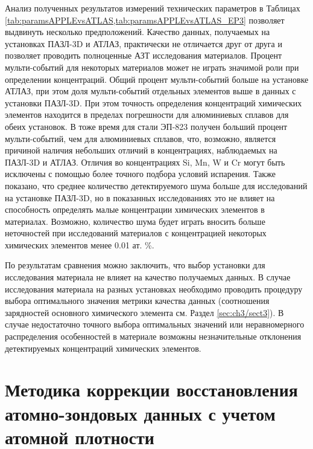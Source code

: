 Анализ полученных результатов измерений технических параметров в Таблицах \cref{tab:paramsAPPLEvsATLAS,tab:paramsAPPLEvsATLAS_EP3} позволяет выдвинуть несколько предположений. Качество данных, получаемых на установках ПАЗЛ-3D и АТЛАЗ, практически не отличается друг от друга и позволяет проводить полноценные АЗТ исследования материалов. Процент мульти-событий для некоторых материалов может не играть значимой роли при определении концентраций. Общий процент мульти-событий больше на установке АТЛАЗ, при этом доля мульти-событий отдельных элементов выше в данных с установки ПАЗЛ-3D. При этом точность определения концентраций химических элементов находится в пределах погрешности для алюминиевых сплавов для обеих установок. В тоже время для стали ЭП-823 получен больший процент мульти-событий, чем для алюминиевых сплавов, что, возможно, является причиной наличия небольших отличий в концентрациях, наблюдаемых на ПАЗЛ-3D и АТЛАЗ. Отличия во концентрациях Si, Mn, W и Cr могут быть исключены с помощью более точного подбора условий испарения. Также показано, что среднее количество детектируемого шума больше для исследований на установке ПАЗЛ-3D, но в показанных исследованиях это не влияет на способность определять малые концентрации химических элементов в материалах. Возможно, количество шума будет играть вносить больше неточностей при исследований материалов с концентрацией некоторых химических элементов менее 0.01 ат. \%.

По результатам сравнения можно заключить, что выбор установки для исследования материала не влияет на качество получаемых данных. В случае исследования материала на разных установках необходимо проводить процедуру выбора оптимального значения метрики качества данных (соотношения зарядностей основного химического элемента см. Раздел \cref{sec:ch3/sect3}). В случае недостаточно точного выбора оптимальных значений или неравномерного распределения особенностей в материале возможны незначительные отклонения детектируемых концентраций химических элементов.


\FloatBarrier

\section{Методика коррекции восстановления атомно-зондовых данных с учетом атомной плотности}\label{sec:ch3/sect5}

